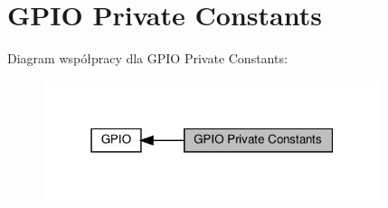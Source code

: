 \hypertarget{group___g_p_i_o___private___constants}{}\section{G\+P\+IO Private Constants}
\label{group___g_p_i_o___private___constants}
Diagram współpracy dla G\+P\+IO Private Constants\+:\nopagebreak
\begin{figure}[H]
\begin{center}
\leavevmode
\includegraphics[width=280pt]{group___g_p_i_o___private___constants}
\end{center}
\end{figure}
